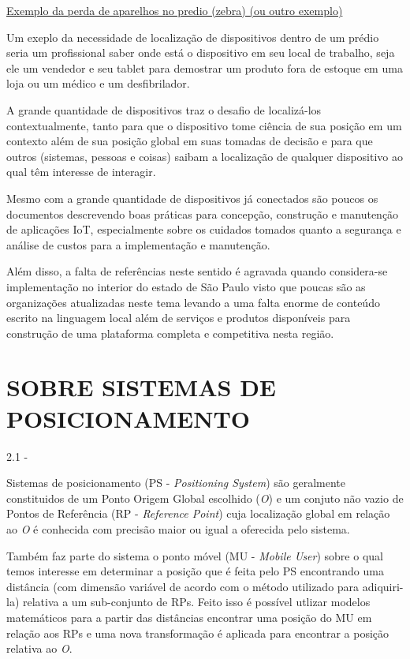 \documentclass[
	12pt,				%
	openright,			%
	oneside,			%
	a4paper,			%
	chapter=TITLE,		%
	english,			%
	french,				%
	spanish,			%
	brazil				%
	]{abntex2}
\begin{document}
{\underline{Exemplo da perda de aparelhos no predio (zebra) (ou outro exemplo)}

Um exeplo da necessidade de localização de dispositivos dentro de um prédio
seria um profissional saber onde está o dispositivo em seu local de trabalho,
seja ele um vendedor e seu tablet para demostrar um produto fora de estoque em
uma loja ou um médico e um desfibrilador.

A grande quantidade de dispositivos traz o desafio de localizá-los
contextualmente, tanto para que o dispositivo tome ciência de sua posição em um
contexto além de sua posição global em suas tomadas de decisão e para que outros
(sistemas, pessoas e coisas) saibam a localização de qualquer dispositivo ao
qual têm interesse de interagir.

Mesmo com a grande quantidade de dispositivos já conectados são poucos os
documentos descrevendo boas práticas para concepção, construção e manutenção de
aplicações IoT, especialmente sobre os cuidados tomados quanto a segurança e
análise de custos para a implementação e manutenção.

Além disso, a falta de referências neste sentido é agravada quando considera-se
implementação no interior do estado de São Paulo visto que poucas são as
organizações atualizadas neste tema levando a uma falta enorme de conteúdo
escrito na linguagem local além de serviços e produtos disponíveis para
construção de uma plataforma completa e competitiva nesta região.


\section{SOBRE SISTEMAS DE POSICIONAMENTO}
\label{sec:SOBRE SISTEMAS DE POSICIONAMENTO}

 2.1 -

Sistemas de posicionamento (PS - \textit{Positioning System}) são geralmente
constituidos de um Ponto Origem Global escolhido (\textit{O}) e um conjuto não vazio de
Pontos de Referência (RP - \textit{Reference Point}) cuja localização global em relação
ao \textit{O} é conhecida com precisão maior ou igual a oferecida pelo sistema.

Também faz parte do sistema o ponto móvel (MU - \textit{Mobile User}) sobre o qual
temos interesse em determinar a posição que é feita pelo PS encontrando uma
distância (com dimensão variável de acordo com o método utilizado para
adiquiri-la) relativa a um sub-conjunto de RPs. Feito isso é possível utlizar
modelos matemáticos para a partir das distâncias encontrar uma posição do MU em
relação aos RPs e uma nova transformação é aplicada para encontrar a posição
relativa ao \textit{O}.

}
\end{document}
